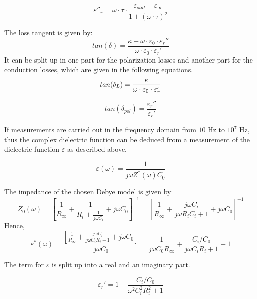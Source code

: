 \begin{equation}
\varepsilon''_r = \omega \cdot \tau \cdot \frac{\varepsilon_{stat}-\varepsilon_{\infty}}{1+(\omega \cdot \tau )^2}
\end{equation}

The loss tangent is given by:
\begin{equation}
tan (\delta) = \frac{\kappa + \omega \cdot \varepsilon_0 \cdot \varepsilon _r ''}{\omega \cdot \varepsilon_0 \cdot \varepsilon _r '}
\end{equation}
It can be split up in one part for the polarization losses and another part for the conduction losses, which are given in the following equations. 
\begin{equation}
tan (\delta_{L}) = \frac{\kappa}{\omega \cdot \varepsilon_0 \cdot \varepsilon_r'} \newline
\end{equation}

\begin{equation}
tan (\delta_{pol}) = \frac {\varepsilon_r'' } {\varepsilon_r'}
\end{equation}


If measurements are carried out in the frequency domain from $10$ Hz to $10^{7}$ Hz, thus the complex dielectric function can be deduced from a measurement of the  dielectric function $\varepsilon$ as described above. 

\begin{equation}
\varepsilon(\omega) = \frac{1}{j \omega  Z^*(\omega) C_0}
\end{equation}

The impedance of the chosen Debye model is given by 
\begin{equation}
Z_0(\omega)=[\frac{1}{R_\infty}+\frac{1}{R_i+\frac{1}{j \omega C_i}}+j \omega C_0]^{-1} = [\frac{1}{R_\infty}+\frac{j \omega C_i}{j\omega R_i  C_i+1}+j \omega C_0]^{-1}
\end{equation}
Hence,
\begin{equation}
\varepsilon^*(\omega)= \frac{[\frac{1}{R_\infty}+\frac{j \omega C_i}{j\omega C_i R_i  +1}+j \omega C_0]}{j \omega C_0} = \frac{1}{j \omega C_0 R_\infty}+ \frac{C_i/C_0}{j\omega C_i R_i  +1}+1
\end{equation}

The term for $\varepsilon$ is split up into a real and an imaginary part. 

\begin{equation}
\varepsilon_r' = 1+ \frac{C_i/C_0}{\omega^2 C_i^2 R_i^2 +1}
\end{equation}

